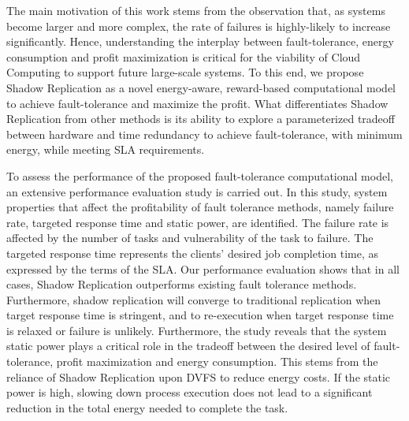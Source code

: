 \noindent 

The main motivation of this work stems from the observation that, as systems become larger and more complex, the
rate of failures is highly-likely to increase significantly.  
Hence, understanding the interplay between fault-tolerance, energy consumption 
and profit maximization is critical for the viability of Cloud Computing
to support future large-scale systems.
To this end, we propose Shadow Replication as a novel energy-aware, 
reward-based computational model to achieve fault-tolerance and
maximize the profit. 
What differentiates Shadow Replication from other
methods is its ability to explore a
parameterized tradeoff between hardware and time redundancy to achieve fault-tolerance, with minimum energy, 
while meeting SLA requirements. 

To assess the performance of the proposed fault-tolerance computational
model, an extensive performance evaluation study is carried out. 
In this study, system properties that affect the
profitability of fault tolerance methods, namely failure rate,
targeted response time and static power, are identified. The failure rate is
affected by the number of tasks and vulnerability of the task
to failure. The targeted response time represents the 
clients' desired job completion time, as expressed by the terms of the SLA.  
Our performance evaluation shows that in all cases, Shadow Replication outperforms
existing fault tolerance methods. Furthermore, shadow
replication will converge to traditional replication when target response time is stringent, and to re-execution when target response time is relaxed or failure is unlikely. Furthermore, the study reveals that the system static power plays a critical role in the tradeoff between the 
desired level of fault-tolerance, profit maximization and energy consumption.
This stems from the reliance of Shadow Replication upon DVFS to reduce 
energy costs. If the static power is high, slowing down process 
execution does not lead to a significant reduction in the total energy 
needed to complete the task.



